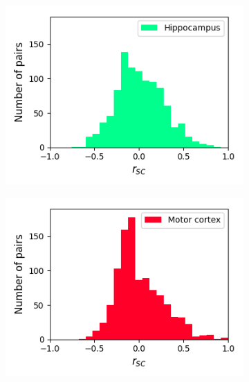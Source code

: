 \documentclass[a4paper,12pt]{article}
\theoremstyle{definition}
\begin{document}
\begin{figure}[p]
  \begin{subfigure}{0.5\textwidth}
    \centering
    \includegraphics[width=\textwidth]{figures/all_hippocampus_6_1p0_correlation_histogram.png}
  \end{subfigure}
  \begin{subfigure}{0.5\textwidth}
    \centering
    \includegraphics[width=\textwidth]{figures/all_motor_cortex_10_1p0_correlation_histogram.png}
  \end{subfigure}
  \begin{subfigure}{0.5\textwidth}
    \centering

\end{subfigure}
\end{figure}
\end{document}
